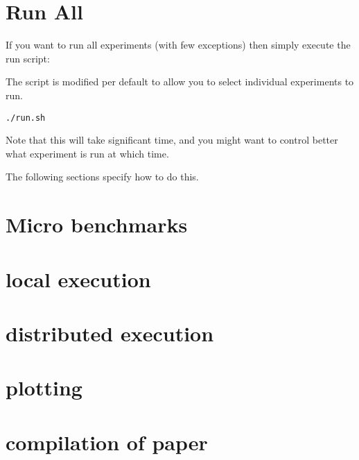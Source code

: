 \documentclass{readme}
\begin{document}
\section{Run All}

If you want to run all experiments (with few exceptions)
then simply execute the run script:

The script is modified per default to allow you to select individual experiments to run.



\begin{lstlisting}
./run.sh
\end{lstlisting}

Note that this will take significant time, and you might want to
control better what experiment is run at which time.

The following sections specify how to do this.

\section{Micro benchmarks}




\section{local execution}

\section{distributed execution}

\section{plotting}

\section{compilation of paper}
\end{document}
